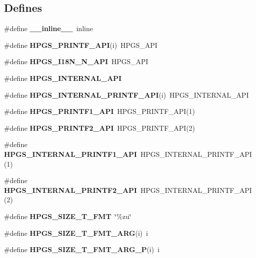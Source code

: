 \subsection*{Defines}
\begin{DoxyCompactItemize}
\item 
\#define {\bfseries \_\-\_\-inline\_\-\_\-}~inline\label{hpgs_8h_a9f04218fe09e6ee659e045b2f11542ed}

\item 
\#define {\bfseries HPGS\_\-PRINTF\_\-API}(i)~HPGS\_\-API\label{hpgs_8h_a841b8789fdbbdf99423a4a1fd472e6cf}

\item 
\#define {\bfseries HPGS\_\-I18N\_\-N\_\-API}~HPGS\_\-API\label{hpgs_8h_affd075aa3892f19e16a1125ba76a1293}

\item 
\#define {\bfseries HPGS\_\-INTERNAL\_\-API}\label{hpgs_8h_a379e6e83d48ee3f86f3907930d664b87}

\item 
\#define {\bfseries HPGS\_\-INTERNAL\_\-PRINTF\_\-API}(i)~HPGS\_\-INTERNAL\_\-API\label{hpgs_8h_a587752cd1981a07da1cf88299cb96b71}

\item 
\#define {\bfseries HPGS\_\-PRINTF1\_\-API}~HPGS\_\-PRINTF\_\-API(1)\label{hpgs_8h_ae770da628b9829fdf6dd9a26f8cd4100}

\item 
\#define {\bfseries HPGS\_\-PRINTF2\_\-API}~HPGS\_\-PRINTF\_\-API(2)\label{hpgs_8h_a16149d9df2a5b43ef9c91bafebbb2ccf}

\item 
\#define {\bfseries HPGS\_\-INTERNAL\_\-PRINTF1\_\-API}~HPGS\_\-INTERNAL\_\-PRINTF\_\-API(1)\label{hpgs_8h_a35416b7d7d1b18a914e776346ac2312c}

\item 
\#define {\bfseries HPGS\_\-INTERNAL\_\-PRINTF2\_\-API}~HPGS\_\-INTERNAL\_\-PRINTF\_\-API(2)\label{hpgs_8h_a87a8358970381118710cbc7dfa138082}

\item 
\#define {\bfseries HPGS\_\-SIZE\_\-T\_\-FMT}~\char`\"{}\%zu\char`\"{}\label{hpgs_8h_a90a47e4f17a389176f98b2702820e9e3}

\item 
\#define {\bfseries HPGS\_\-SIZE\_\-T\_\-FMT\_\-ARG}(i)~i\label{hpgs_8h_aede6095049e96170a391f8705a15f04d}

\item 
\#define {\bfseries HPGS\_\-SIZE\_\-T\_\-FMT\_\-ARG\_\-P}(i)~i\label{hpgs_8h_a548f50befa3d2581f0ee540c74e5cdb7}


\end{DoxyCompactItemize}

